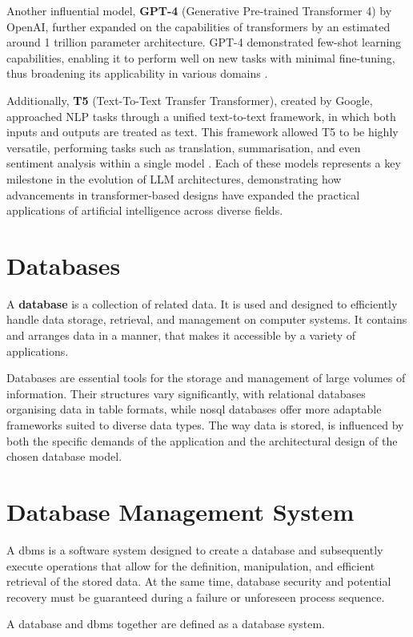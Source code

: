 Another influential model, \textbf{GPT-4} (Generative Pre-trained Transformer 4) by OpenAI, further expanded on the capabilities of transformers by an estimated around 1 trillion parameter architecture. GPT-4 demonstrated few-shot learning capabilities, enabling it to perform well on new tasks with minimal fine-tuning, thus broadening its applicability in various domains \citep{brown2020gpt3}. 

Additionally, \textbf{T5} (Text-To-Text Transfer Transformer), created by Google, approached NLP tasks through a unified text-to-text framework, in which both inputs and outputs are treated as text. This framework allowed T5 to be highly versatile, performing tasks such as translation, summarisation, and even sentiment analysis within a single model \citep{raffel2020t5}. Each of these models represents a key milestone in the evolution of LLM architectures, demonstrating how advancements in transformer-based designs have expanded the practical applications of artificial intelligence across diverse fields.

\section{Databases}\label{sec:databases}
\begin{definition}\label{def:database}
    A \textbf{database} is a collection of related data\citep{limited2010introduction}. 
    It is used and designed to efficiently handle data storage, retrieval, and management on computer systems. 
    It contains and arranges data in a manner, that makes it accessible by a variety of applications.
\end{definition}
Databases are essential tools for the storage and management of large volumes of information. 
Their structures vary significantly, with relational databases organising data in table formats, while \ac{nosql} databases offer more adaptable frameworks suited to diverse data types. 
The way data is stored, is influenced by both the specific demands of the application and the architectural design of the chosen database model.
\section{Database Management System}\label{sec:Database Management System}
\begin{definition}\label{def:Database Management System}
    A \ac{dbms}  is a software system designed to create a database and subsequently execute operations that allow for the definition, manipulation, and efficient retrieval of the stored data. 
    At the same time, database security and potential recovery must be guaranteed during a failure or unforeseen process sequence. \citep{limited2010introduction}
\end{definition}
A database and \ac{dbms} together are defined as a database system.  

